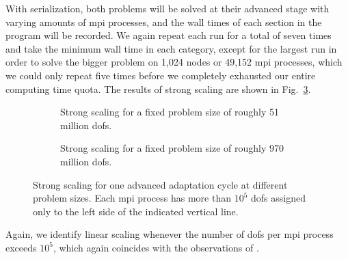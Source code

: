 With serialization, both problems will be solved at their advanced stage with varying amounts of \gls{mpi} processes, and the wall times of each section in the program will be recorded. We again repeat each run for a total of seven times and take the minimum wall time in each category, except for the largest run in order to solve the bigger problem on 1,024 nodes or 49,152 \gls{mpi} processes, which we could only repeat five times before we completely exhausted our entire computing time quota. The results of strong scaling are shown in Fig.~\ref{fig:strong}.

\begin{figure}
\begin{subfigure}{1\textwidth}
  \centering
  \caption{Strong scaling for a fixed problem size of roughly 51 million \glspl{dof}.}
  \label{fig:strong-nrefs10}
\end{subfigure}
\begin{subfigure}{1\textwidth}
  \centering
  \caption{Strong scaling for a fixed problem size of roughly 970 million \glspl{dof}.}
  \label{fig:strong-nrefs12}
\end{subfigure}
\caption{Strong scaling for one advanced adaptation cycle at different problem sizes. Each \gls{mpi} process has more than $10^5$ \glspl{dof} assigned only to the left side of the indicated vertical line.}
\label{fig:strong}
\end{figure}

Again, we identify linear scaling whenever the number of \glspl{dof} per \gls{mpi} process exceeds $10^5$, which again coincides with the observations of \textcite{bangerth2012}.